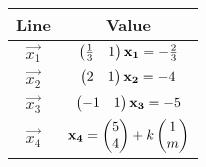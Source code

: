 \begin{tabular}{|c|c|}
\hline
\textbf{Line} & \textbf{Value} \\
\hline
$\vec{x_1}$ & $\begin{pmatrix}\tfrac{1}{3} & 1\end{pmatrix}\mathbf{x_1} = -\tfrac{2}{3}$ \\ \hline
$\vec{x_2}$ & $\begin{pmatrix}2 & 1\end{pmatrix}\mathbf{x_2} = -4$ \\ \hline
$\vec{x_3}$ & $\begin{pmatrix}-1 & 1\end{pmatrix}\mathbf{x_3} = -5$ \\ \hline
$\vec{x_4}$ & $\mathbf{x_4} = \begin{pmatrix}5\\4\end{pmatrix} + k\begin{pmatrix}1\\m\end{pmatrix}$ \\ \hline
\end{tabular}
